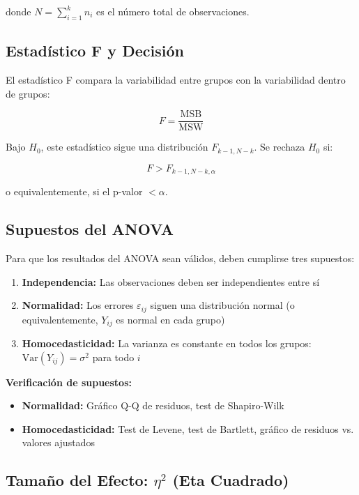 \documentclass[11pt,a4paper]{article}
\theoremstyle{definition}
\begin{document}
donde $N = \sum_{i=1}^{k} n_i$ es el número total de observaciones.

\subsection{Estadístico F y Decisión}

El estadístico F compara la variabilidad entre grupos con la variabilidad dentro de grupos:

\begin{equation}
F = \frac{\text{MSB}}{\text{MSW}}
\end{equation}

Bajo $H_0$, este estadístico sigue una distribución $F_{k-1, N-k}$. Se rechaza $H_0$ si:

\begin{equation}
F > F_{k-1, N-k, \alpha}
\end{equation}

o equivalentemente, si el p-valor $< \alpha$.

\subsection{Supuestos del ANOVA}

Para que los resultados del ANOVA sean válidos, deben cumplirse tres supuestos:

\begin{enumerate}
    \item \textbf{Independencia:} Las observaciones deben ser independientes entre sí
    \item \textbf{Normalidad:} Los errores $\varepsilon_{ij}$ siguen una distribución normal (o equivalentemente, $Y_{ij}$ es normal en cada grupo)
    \item \textbf{Homocedasticidad:} La varianza es constante en todos los grupos: $\text{Var}(Y_{ij}) = \sigma^2$ para todo $i$
\end{enumerate}

\textbf{Verificación de supuestos:}
\begin{itemize}
    \item \textbf{Normalidad:} Gráfico Q-Q de residuos, test de Shapiro-Wilk
    \item \textbf{Homocedasticidad:} Test de Levene, test de Bartlett, gráfico de residuos vs. valores ajustados
\end{itemize}

\subsection{Tamaño del Efecto: $\eta^2$ (Eta Cuadrado)}
\end{document}
